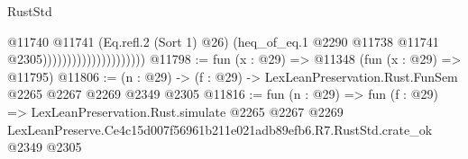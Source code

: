 \begin{lexlean}{RustStd}
\begin{coremodule}
                                          @11740
                                            @11741
                                            (Eq.refl.{2} (Sort 1) @26)
                                            (heq_of_eq.{1}
                                              @2290
                                              @11738
                                              @11741
                                              @2305)))))))))))))))))))))
@11798 := fun (x : @29) => @11348 (fun (x : @29) => @11795)
@11806 := (n : @29) -> (f : @29) -> LexLeanPreservation.Rust.FunSem @2265 @2267 @2269 @2349 @2305
@11816 := fun (n : @29) =>
  fun (f : @29) =>
  LexLeanPreservation.Rust.simulate
    @2265
    @2267
    @2269
    LexLeanPreserve.Ce4c15d007f56961b211e021adb89efb6.R7.RustStd.crate_ok
    @2349
    @2305
\end{coremodule}
\end{lexlean}
